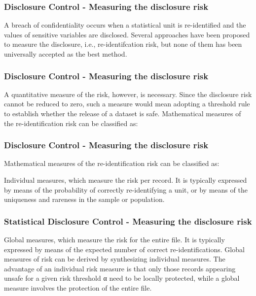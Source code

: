 \documentclass[SDCmaster.tex]{subfiles}
\begin{document}
\begin{frame}
	\frametitle{Disclosure Control - Measuring the disclosure risk}
	\Large
A breach of confidentiality occurs when a statistical unit is re-identified and the values of sensitive variables are disclosed. Several approaches have been proposed to measure the disclosure, i.e., re-identifcation risk, but none of them has been universally accepted as the best method.
\end{frame}
\begin{frame}
	\frametitle{Disclosure Control - Measuring the disclosure risk}
	\Large
A quantitative measure of the risk, however, is necessary. Since the disclosure risk cannot be reduced to zero, such a measure would mean adopting a threshold rule to establish whether the release of a dataset is safe. Mathematical measures of the re-identification risk can be classified as:
\end{frame}
\begin{frame}
	\frametitle{Disclosure Control - Measuring the disclosure risk}
	\Large
Mathematical measures of the re-identification risk can be classified as:

Individual measures, which measure the risk per record. It is typically expressed by means of the probability of correctly re-identifying a unit, or by means of the uniqueness and rareness in the sample or population.
\end{frame}
\begin{frame}
	\frametitle{Statistical Disclosure Control - Measuring the disclosure risk}
	\Large
	
Global measures, which measure the risk for the entire file. It is typically expressed by means of the expected number of correct re-identifications. Global measures of risk can be derived by synthesizing individual measures.
The advantage of an individual risk measure is that only those records appearing unsafe for a given risk threshold α need to be locally protected, while a global measure involves the protection of the entire file.
\end{frame}
\end{document}
